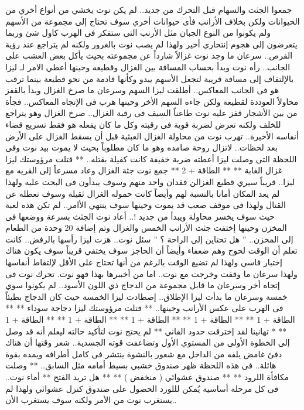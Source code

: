 جمعوا الجثث والسهام قبل التحرك من جديد..
لم يكن نوت يخشي من أنواع أخري من الحيوانات ولكن بخلاف الأرانب فأى حيوانات أخري سوف تحتاج إلى مجموعة من الأسهم ولم يكونوا من النوع الجبان مثل الأرنب التى ستفكر فى الهرب كاول شئ وربما يتعرضون إلى هجوم إنتحاري أخير ولهذا لم يصب نوت بالغرور ولكنه لم يتراجع عند رؤية الفرص..
سرعان ما وجد نوت غزالاً شارداً عن مجموعته بحيث يأكل بعض العشب على الجانب..
رأه نوت وبدأ بحساب المسافة بين الغزال وقطيعه وحينها أعطي الامر لـ ليزا بالإلتفاف إلى مسافة قريبة لتجعل الأسهم يبدو وكأنها قادمة من نحو قطيعة بينما ترقب هو فى الجانب المعاكس..
أطلقت ليزا السهم وسرعان ما صرخ الغزال وبدأ بالقفز محاولاً العوددة لقطيعة ولكن جاءه السهم الأخر وحينها هرب فى الإتجاه المعاكس..
فجأة من بين الأشجار قفز عليه نوت طاعناً السيف فى رقبة الغزال..
صرخ الغزال وهو يتراجع للخلف ولكنه تعرض لضربة قوية فى رقبته وكل ما كان يفعله هو فقط تسريع قضاء أنفاسه الأخيرة..
تهرب نوت من محاولة الغزال العبثية قبل أن يسقط الغزال على الأرض بعد لحظات..
لاتزال روحة صامده وهو ما كان مطلوباً بحيث لا يموت بيد نوت وفى اللحظة التى وصلت ليزا أعطته ضربة خفيفة كانت كفيلة بقتله..
** قتلت مرؤوستك ليزا غزال الغابة **
** الطاقة + 2 **
جمع نوت جثة الغزال وعاد مسرعاً إلى القريه مع ليزا..
قريباً سيري قطيع الغزالن فقدان واحد منهم وسوف يبدأون فى البحث عليه ولهذا لم يعد المكان أمانا بالنسبة لهم وأيضاً كانت حموله الغزال ثقيلة وسوف تعطله عن القتال ولهذا فى موقف صعب قد يموت وحينها سوف ينتهي الأامر..
لم تكن هذه لعبة حيث سوف يخسر محاولة ويبدأ من جديد !..
أعاد نوت الجثث بسرعة ووضعها فى المخزن وحينها إختفت جثث الأرانب الخمس والغزال وتم إضافة 20 وحدة من الطعام إلى المخزن..
” هل تحتاين إلى الراحة ؟ ” سئل نوت..
هزت ليزا رأسها بالرفض..
كانت تعلم أن الوقت لحوح وهم ضعفاء وأيضاً أن الحاجز سوف يختفي قريباً سوف يكون هناك إختبار قاسي ولهذا لم تضيع الوقت بالرغم من أنها تحتاج على الأقل لإلتقاط أنفاسها ولهذا سرعان ما وقفت وخرجت مع نوت..
اما من أخببرها بهذا فهو نوت.
تحرك نوت فى إتجاه أخر وسرعان ما قابل مجموعة من الدجاج ذي اللون الأسود..
لم يكونوا سوي خمسة وسرعان ما بدأت ليزا الإطلاق..
إصطادت ليزا الخمسة حيث كان الدجاج بطيئاً فى الهرب على عكس الأرانب وحينها..
** قتلت مرؤوستك ليزا دجاجة سوداء **
** الطاقة + 1 **
** الطاقة + 1 **
** الطاقة + 1 **
** الطاقة + 1 **
** الطاقة + 1 **
* تهانينا لقد إخترقت حدود الفاني **
لم يحتج نوت لتأكيد حالته ليعلم أنه قد وصل إلى الخطوة الأولى من المستوي الأول وتضاعفت قوته الجسدية..
شعر وقتها أن هناك دفئ غامض يلفه من الداخل مع شعور بالنشوة ينتشر فى كامل أطرافه ويمده بقوة هائلة..
فى هذه اللحظة ظهر صندوق خشبي بسيط أمامه مثل السابق..
** وصلت مكافأة اللرود **
** صندوق عشوائي ( منخفض ) **
** هل تريد الفتح **
أماء نوت..
فى كل مرحلة أساسية يُمكن لللورد الحصول على صندوق كنزل عشوائي ولهذا لم يستغرب نوت من الأمر ولكنه سوف يستغرب الأن..
